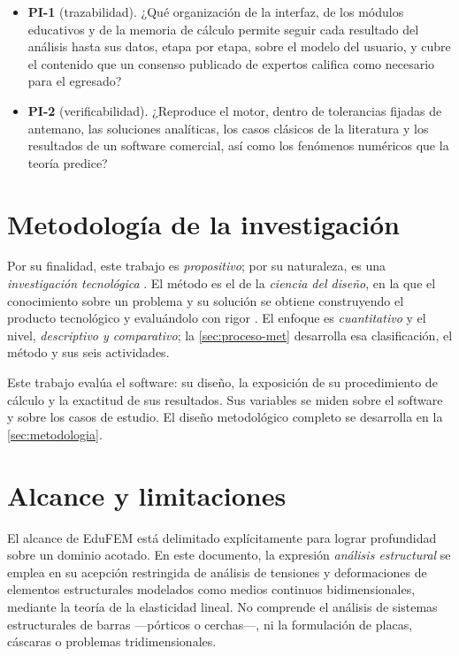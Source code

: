 \begin{itemize}
    \item \textbf{PI-1} (trazabilidad). ¿Qué organización de la interfaz, de los módulos educativos y de la memoria de cálculo permite seguir cada resultado del análisis hasta sus datos, etapa por etapa, sobre el modelo del usuario, y cubre el contenido que un consenso publicado de expertos califica como necesario para el egresado?
    \item \textbf{PI-2} (verificabilidad). ¿Reproduce el motor, dentro de tolerancias fijadas de antemano, las soluciones analíticas, los casos clásicos de la literatura y los resultados de un software comercial, así como los fenómenos numéricos que la teoría predice?
\end{itemize}

\section*{Metodología de la investigación}

Por su finalidad, este trabajo es \emph{propositivo}; por su naturaleza, es una \emph{investigación tecnológica} \autocite[p.~91]{garciacordoba2005tecnologica}. El método es el de la \emph{ciencia del diseño}, en la que el conocimiento sobre un problema y su solución se obtiene construyendo el producto tecnológico y evaluándolo con rigor \autocite[p.~75]{hevner2004design}. El enfoque es \emph{cuantitativo} y el nivel, \emph{descriptivo y comparativo}; la \autoref{sec:proceso-met} desarrolla esa clasificación, el método y sus seis actividades.

Este trabajo evalúa el software: su diseño, la exposición de su procedimiento de cálculo y la exactitud de sus resultados. Sus variables se miden sobre el software y sobre los casos de estudio. El diseño metodológico completo se desarrolla en la \autoref{sec:metodologia}.

\section*{Alcance y limitaciones}

El alcance de EduFEM está delimitado explícitamente para lograr profundidad sobre un dominio acotado. En este documento, la expresión \emph{análisis estructural} se emplea en su acepción restringida de análisis de tensiones y deformaciones de elementos estructurales modelados como medios continuos bidimensionales, mediante la teoría de la elasticidad lineal. No comprende el análisis de sistemas estructurales de barras —pórticos o cerchas—, ni la formulación de placas, cáscaras o problemas tridimensionales.

